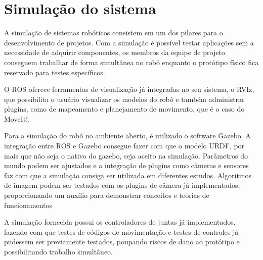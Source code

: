 \section{Simulação do sistema}
\label{sec:sim}
A simulação de sistemas robóticos consistem em um dos pilares para o desenvolvimento de projetos. Com a simulação é possível testar aplicações sem a necessidade de adquirir componentes, os membros da equipe de projeto conseguem trabalhar de forma simultânea no robô enquanto o protótipo físico fica reservado para testes específicos.

O ROS oferece ferramentas de visualização já integradas no seu sistema, o RVIz, que possibilita o usuário visualizar os modelos do robô e também administrar plugins, como de mapeamento e planejamento de movimento, que é o caso do MoveIt!.

Para a simulação do robô no ambiente aberto, é utilizado  o software Gazebo. A integração entre ROS e Gazebo consegue fazer com que o modelo URDF, por mais que não seja o nativo do gazebo, seja aceito na simulação. Parâmetros do mundo podem ser ajustados e a integração de plugins como câmeras e sensores faz com que a simulação consiga ser utilizada em diferentes estudos. Algoritmos de imagem podem ser testados com os plugins de câmera já implementados, proporcionando um auxílio para demonstrar conceitos e teorias de funcionamentos

A simulação fornecida possui os controladores de juntas já implementados, fazendo com que testes de códigos de movimentação e testes de controles já pudessem ser previamente testados, poupando riscos de dano ao protótipo e possibilitando trabalho simultâneo.




